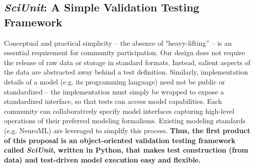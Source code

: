 \documentclass[11pt,letterpaper]{article}
\begin{document}
\subsection{\textit{SciUnit}: A Simple Validation Testing Framework}
Conceptual and practical simplicity -- the absence of "heavy-lifting'' -- is an essential requirement for community participation. Our design does not require the release of raw data or storage in standard formats. Instead, salient aspects of the data are abstracted away behind a test definition. Similarly, implementation details of a model (e.g. its programming language) need not be public or standardized -- the implementation must simply be wrapped to expose a standardized interface, so that tests can access model capabilities. Each community can collaboratively specify model interfaces capturing high-level operations of their preferred modeling formalisms. Existing modeling standards (e.g. NeuroML\cite{neuroml_url,gleeson_neuroml:_2010}) are leveraged to simplify this process. \textbf{Thus, the first product of this proposal is an object-oriented validation testing framework called \textit{SciUnit}, written in Python, that makes test construction (from data) and test-driven model execution easy and flexible.} 
\end{document}
